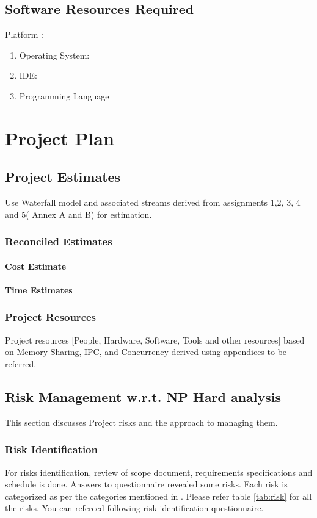 \documentclass[oneside,a4paper,12pt]{report}
\begin{document}
\section{Software Resources Required}
Platform : 
\begin{enumerate}
\item Operating System: 
\item IDE: 
\item Programming Language
\end{enumerate}




\chapter{Project Plan}

\section{Project Estimates}
                 Use Waterfall model and associated streams derived from assignments 1,2, 3, 4 and 5( Annex A and B) for estimation. 
\subsection{Reconciled Estimates}
\subsubsection{Cost Estimate}

\subsubsection{Time Estimates}


\subsection{Project Resources}
          Project resources  [People, Hardware, Software, Tools and other resources] based on Memory Sharing, IPC, and Concurrency derived using appendices to be referred. 

\section{Risk Management w.r.t. NP Hard analysis}
This section discusses Project risks and the approach to managing them.
\subsection{Risk Identification}
For risks identification, review of scope document, requirements specifications and schedule is done. Answers to questionnaire revealed some risks. Each risk is categorized as per the categories mentioned in \cite{bookPressman}. Please refer table \ref{tab:risk} for all the risks. You can refereed following risk identification questionnaire.
\end{document}
